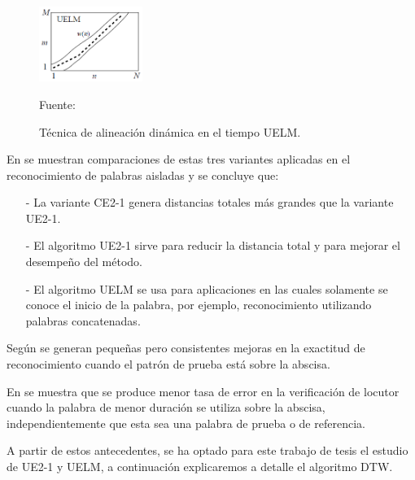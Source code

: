 \begin{enumerate}
\begin{figure}[H]
\begin{center}
\includegraphics[width=0.3\textwidth]{Imagenes/Cap2/image052}
\end{center}
\begin{center}
\vskip -0.5cm
\caption{\small{Técnica de alineación dinámica en el tiempo UELM.}}
\label{fig:figura2.51}
{\small{Fuente: \cite{rabiner}}}
\end{center}
\end{figure}
\newpage
En \cite{rabiner2} se muestran comparaciones de estas tres variantes aplicadas en el reconocimiento de palabras aisladas y se concluye que:
\begin{enumerate}
\item[-]La variante CE2-1 genera distancias totales más grandes que la variante UE2-1.
\item[-]El algoritmo UE2-1 sirve para reducir la distancia total y para mejorar el desempeño del método.
\item[-]El algoritmo UELM se usa para aplicaciones en las cuales solamente se conoce el inicio de la palabra, por ejemplo, reconocimiento utilizando palabras concatenadas.
\end{enumerate}

Según \cite{rabiner3} se generan pequeñas pero consistentes mejoras en la exactitud de reconocimiento cuando el patrón de prueba está sobre la abscisa.

\vskip 0.5cm
En \citep{furui} se muestra que se produce menor tasa de error en la verificación de locutor cuando la palabra de menor duración se utiliza sobre la abscisa, independientemente que esta sea una palabra de prueba o de referencia.

\vskip 0.5cm
A partir de estos antecedentes, se ha optado para este trabajo de tesis el estudio de UE2-1 y UELM, a continuación explicaremos a detalle el algoritmo DTW.


\end{enumerate}
